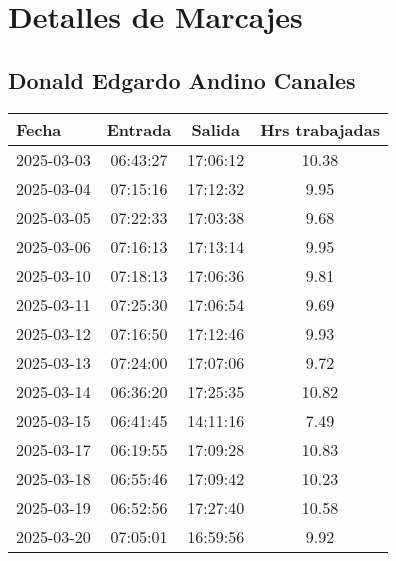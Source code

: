 \documentclass[11pt,a4paper]{article}
\newcommand{\mejoradatabla}[1]{
  \renewcommand{\arraystretch}{1.3}
  \setlength{\tabcolsep}{10pt}
  #1
  \renewcommand{\arraystretch}{1}
  \setlength{\tabcolsep}{6pt}
}
\begin{document}
\clearpage

\section{Detalles de Marcajes}



\subsection{ Donald Edgardo Andino Canales }

\begin{minipage}[t]{0.62\textwidth}
\mejoradatabla{
\begin{tabular}{lccc}
\toprule
\rowcolor{grisclaro} \textbf{Fecha} & \textbf{Entrada} & \textbf{Salida} & \textbf{Hrs trabajadas}\\
\midrule

2025-03-03 & 06:43:27 & 17:06:12 & 10.38\\

2025-03-04 & 07:15:16 & 17:12:32 & 9.95\\

2025-03-05 & 07:22:33 & 17:03:38 & 9.68\\

2025-03-06 & 07:16:13 & 17:13:14 & 9.95\\

2025-03-10 & 07:18:13 & 17:06:36 & 9.81\\

2025-03-11 & 07:25:30 & 17:06:54 & 9.69\\

2025-03-12 & 07:16:50 & 17:12:46 & 9.93\\

2025-03-13 & 07:24:00 & 17:07:06 & 9.72\\

2025-03-14 & 06:36:20 & 17:25:35 & 10.82\\

2025-03-15 & 06:41:45 & 14:11:16 & 7.49\\

2025-03-17 & 06:19:55 & 17:09:28 & 10.83\\

2025-03-18 & 06:55:46 & 17:09:42 & 10.23\\

2025-03-19 & 06:52:56 & 17:27:40 & 10.58\\

2025-03-20 & 07:05:01 & 16:59:56 & 9.92\\


\end{tabular}}
\end{minipage}
\end{document}
